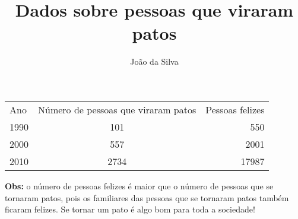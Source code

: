 \documentclass[12pt, a4paper]{article}
\title{Dados sobre pessoas que viraram patos}
\author{João da Silva}
\begin{document}
  \maketitle

  \begin{tabular}{l c r}
    Ano & Número de pessoas que viraram patos & Pessoas felizes\\
    1990 & 101 & 550\\
    2000 & 557 & 2001\\
    2010 & 2734 & 17987\\
  \end{tabular}
  
  \textbf{Obs:} o número de pessoas felizes é maior que o número de pessoas que se tornaram patos, pois os familiares das pessoas que se tornaram patos também ficaram felizes. Se tornar um pato é algo bom para toda a sociedade!
\end{document}
